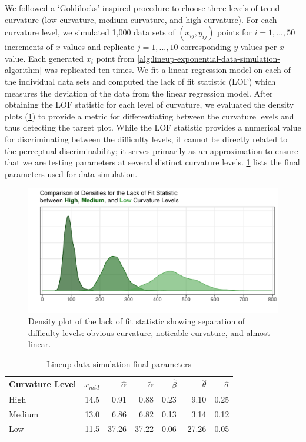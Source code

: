 \documentclass[12pt]{article}
\begin{document}
We followed a `Goldilocks' inspired procedure to choose three levels of
trend curvature (low curvature, medium curvature, and high curvature).
For each curvature level, we simulated 1,000 data sets of
\((x_{ij}, y_{ij})\) points for \(i = 1,...,50\) increments of
\(x\)-values and replicate \(j = 1,...,10\) corresponding \(y\)-values
per \(x\)-value. Each generated \(x_i\) point from
\cref{alg:lineup-exponential-data-simulation-algorithm} was replicated
ten times. We fit a linear regression model on each of the individual
data sets and computed the lack of fit statistic (LOF) which measures
the deviation of the data from the linear regression model. After
obtaining the LOF statistic for each level of curvature, we evaluated
the density plots (\cref{fig:lof-density-curves}) to provide a metric
for differentiating between the curvature levels and thus detecting the
target plot. While the LOF statistic provides a numerical value for
discriminating between the difficulty levels, it cannot be directly
related to the perceptual discriminability; it serves primarily as an
approximation to ensure that we are testing parameters at several
distinct curvature levels. \cref{tab:parameter-data} lists the final
parameters used for data simulation.

\begin{figure}[tbp]

{\centering \includegraphics[width=1\linewidth,]{logarithmic-lineups_files/figure-latex/lof-density-curves-1} 

}

\caption[Lineup parameter selection]{Density plot of the lack of fit statistic showing separation of difficulty levels: obvious curvature, noticable curvature, and almost linear.}\label{fig:lof-density-curves}
\end{figure}

\begin{table}

\caption{\label{tab:parameter-data}Lineup data simulation final parameters}
\centering
\begin{tabular}[t]{lrrrrrr}
\toprule
Curvature Level & $x_{mid}$ & $\hat\alpha$ & $\tilde\alpha$ & $\hat\beta$ & $\hat\theta$ & $\hat\sigma$\\
\midrule
High & 14.5 & 0.91 & 0.88 & 0.23 & 9.10 & 0.25\\
Medium & 13.0 & 6.86 & 6.82 & 0.13 & 3.14 & 0.12\\
Low & 11.5 & 37.26 & 37.22 & 0.06 & -27.26 & 0.05\\
\bottomrule
\end{tabular}
\end{table}
\end{document}
